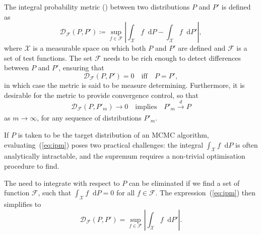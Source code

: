 \documentclass[11pt,a4paper]{report}
\newcommand*\diff{\mathop{}\!\mathrm{d}}
\begin{document}
The integral probability metric (\cite{mullerIntegralProbabilityMetrics1997}) between two distributions $P$ and $P'$ is defined as
\begin{equation}
\mathcal{D}_{\mathcal{F}}(P, P') \coloneq \sup_{f \in \mathcal{F}}\left|\int_\mathcal{X} f \diff P - \int_\mathcal{X} f \diff P' \right|,
\label{eq:ipm}
\end{equation}
where $\mathcal{X}$ is a measurable space on which both $P$ and $P'$ are defined and $\mathcal{F}$ is a set of test functions. The set $\mathcal{F}$ needs to be rich enough to detect differences between $P$ and $P'$, ensuring that
\begin{equation*}
\mathcal{D}_{\mathcal{F}}(P, P') = 0 \quad \text{iff} \quad P = P',
\end{equation*}
in which case the metric is said to be measure determining.
Furthermore, it is desirable for the metric to provide convergence control, so that
\begin{equation*}
\mathcal{D}_{\mathcal{F}}(P, P'_m) \to 0 \quad \text{implies} \quad P'_m \xrightarrow[]{d} P
\end{equation*}
as $m \to \infty$, for any sequence of distributions $P'_m$.

If $P$ is taken to be the target distribution of an MCMC algorithm, evaluating~(\ref{eq:ipm}) poses two practical challenges: the integral $\int_\mathcal{X} f \diff P$ is often analytically intractable, and the supremum requires a non-trivial optimisation procedure to find.

The need to integrate with respect to $P$ can be eliminated if we find a set of function $\mathcal{F}$, such that $\int_\mathcal{X} f \diff P = 0$ for all $f \in \mathcal{F}$. The expression~(\ref{eq:ipm}) then simplifies to
\begin{equation}
\mathcal{D}_{\mathcal{F}}(P, P') = \sup_{f \in \mathcal{F}}\left|\int_\mathcal{X} f \diff P' \right|.
\label{eq:stein-discrepancy-sup}
\end{equation}
\end{document}
